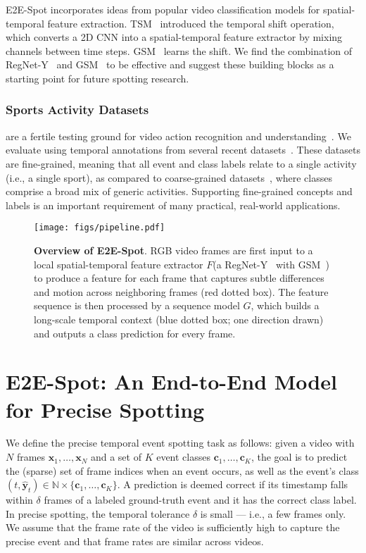 \documentclass[runningheads]{llncs}
\newcommand{\notation}[1]{\ensuremath{#1}\xspace}
\newcommand{\OURMETHOD}{{E2E-Spot}\xspace}
\newcommand{\NumFrames}{\notation{N}}
\newcommand{\NumClasses}{\notation{K}}
\newcommand{\Tolerance}{\notation{\delta}}
\newcommand{\Time}{\notation{t}}
\newcommand{\Frame}[1]{\notation{\mathbf{x}_{#1}}}
\newcommand{\Class}[1]{\notation{\mathbf{c}_{#1}}}
\newcommand{\Prediction}[1]{\notation{\hat{\mathbf{y}}_{#1}}}
\newcommand{\AllFrames}{\notation{\Frame{1},\ldots,\Frame{\NumFrames}}}
\newcommand{\AllClasses}{\notation{\Class{1},\ldots,\Class{\NumClasses}}}
\newcommand{\FeatureExtractor}{\notation{F}}
\newcommand{\TemporalArchitecture}{\notation{G}}
\begin{document}
\OURMETHOD incorporates ideas from popular video classification models for spatial-temporal feature extraction.
TSM~\cite{tsm} introduced the temporal shift operation, which converts a 2D CNN into a spatial-temporal feature extractor by mixing channels between time steps.
GSM~\cite{gsm} learns the shift.
We find the combination of RegNet-Y~\cite{regnet} and GSM~\cite{gsm} to be effective and suggest these building blocks as a starting point for future spotting research.

\subsubsection*{Sports Activity Datasets} are a fertile testing ground for
video action recognition and understanding~\cite{soccernetv2,cbdqsa,vpd,volleyball,diving48,multisports,finegym,finediving,vid2player}.
We evaluate using temporal annotations
from several recent datasets~\cite{soccernetv2,vpd,finegym,finediving,vid2player}.
These datasets are fine-grained, meaning that all event and class labels relate to a single activity (i.e., a single sport), as compared to coarse-grained datasets~\cite{activitynet,thumos14}, where classes comprise a broad mix of generic activities.
Supporting fine-grained concepts and labels is an important requirement of many practical, real-world applications.
 
\begin{figure}[t]
	\centering
	\texttt{[image: figs/pipeline.pdf]}
	\caption{{\bf Overview of \OURMETHOD}.
RGB video frames are first input to a local spatial-temporal feature extractor \FeatureExtractor (a RegNet-Y~\cite{regnet} with GSM~\cite{gsm}) to produce a feature for each frame that captures subtle differences and motion across neighboring frames (red dotted box).
The feature sequence is then processed by a sequence model \TemporalArchitecture, which builds a long-scale temporal context (blue dotted box; one direction drawn) and outputs a class prediction for every frame.
		}
	\label{fig:pipeline}
\end{figure}
 
\section{\OURMETHOD: An End-to-End Model for Precise Spotting}
\label{sec:method}

We define the precise temporal event spotting task as follows: given a
video with $\NumFrames$ frames $\AllFrames$ and a set of $\NumClasses$ event
classes $\AllClasses$, the goal is to predict the (sparse) set of frame indices when an event occurs, as well as the event's class $(\Time,\Prediction{t})\in\mathbb{N} \times\{\AllClasses\}$.
A prediction is deemed correct if its timestamp falls within
\Tolerance frames of a labeled ground-truth event and it has the correct class label.
In precise spotting, the temporal tolerance \Tolerance is small --- i.e., a few
frames only.
We assume that the frame rate of the video is sufficiently high to capture the precise event and that frame rates are similar across videos.
\end{document}
